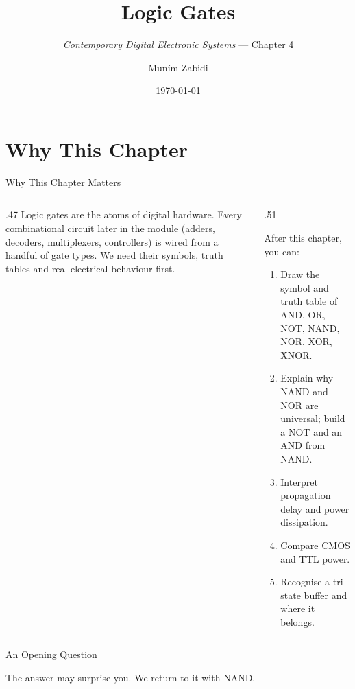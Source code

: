 \documentclass[9pt,aspectratio=169,xcolor=table]{beamer}
\title{Logic Gates}
\subtitle{\emph{Contemporary Digital Electronic Systems} --- Chapter 4}
\author{Mun\'{i}m Zabidi}
\institute{\color{primary}Faculty of Electrical Engineering, Universiti Teknologi Malaysia}
\date{\today}
\begin{document}
\titlepage

\section{Why This Chapter}

\begin{frame}{Why This Chapter Matters}
  \begin{columns}[c]
  \begin{column}{.47\textwidth}
    Logic gates are the \alert{atoms} of digital hardware. Every combinational circuit later in the module (adders, decoders, multiplexers, controllers) is wired from a handful of gate types. We need their symbols, truth tables and real electrical behaviour first.
  \end{column}
  \begin{column}{.51\textwidth}
    \begin{block}{After this chapter, you can:}
    {\small
    \begin{enumerate}\itemsep2pt
      \item Draw the symbol and truth table of AND, OR, NOT, NAND, NOR, XOR, XNOR.
      \item Explain why NAND and NOR are \alert{universal}; build a NOT and an AND from NAND.
      \item Interpret propagation delay and power dissipation.
      \item Compare CMOS and TTL power.
      \item Recognise a tri-state buffer and where it belongs.
    \end{enumerate}}
    \end{block}
  \end{column}
  \end{columns}
\end{frame}

\begin{frame}{An Opening Question}
  \leavevmode\vspace{4mm}
  \begin{center}
  \end{center}
  \vspace{4mm}
  The answer may surprise you. We return to it with NAND.
\end{frame}
\end{document}
